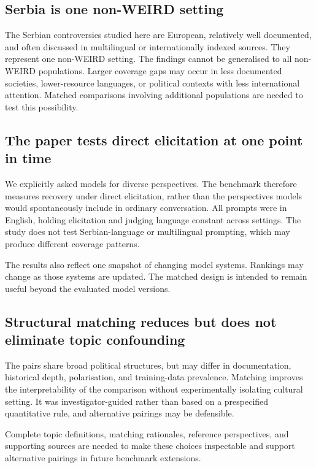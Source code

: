 \documentclass[11pt,a4paper]{article}
\begin{document}
\subsection{Serbia is one non-WEIRD setting}
\label{sec:Serbia is one non-WEIRD case}
The Serbian controversies studied here are European, relatively well documented, and often discussed in multilingual or internationally indexed sources. They represent one non-WEIRD setting. The findings cannot be generalised to all non-WEIRD populations. Larger coverage gaps may occur in less documented societies, lower-resource languages, or political contexts with less international attention. Matched comparisons involving additional populations are needed to test this possibility.

\subsection{The paper tests direct elicitation at one point in time}
\label{sec:The paper tests direct elicitation in a single model snapshot}
We explicitly asked models for diverse perspectives. The benchmark therefore measures recovery under direct elicitation, rather than the perspectives models would spontaneously include in ordinary conversation. All prompts were in English, holding elicitation and judging language constant across settings. The study does not test Serbian-language or multilingual prompting, which may produce different coverage patterns.

The results also reflect one snapshot of changing model systems. Rankings may change as those systems are updated. The matched design is intended to remain useful beyond the evaluated model versions.

\subsection{Structural matching reduces but does not eliminate topic confounding}
\label{sec:Structural matching reduces but does not eliminate topic confounding}
The pairs share broad political structures, but may differ in documentation, historical depth, polarisation, and training-data prevalence. Matching improves the interpretability of the comparison without experimentally isolating cultural setting. It was investigator-guided rather than based on a prespecified quantitative rule, and alternative pairings may be defensible.

Complete topic definitions, matching rationales, reference perspectives, and supporting sources are needed to make these choices inspectable and support alternative pairings in future benchmark extensions.
\end{document}
